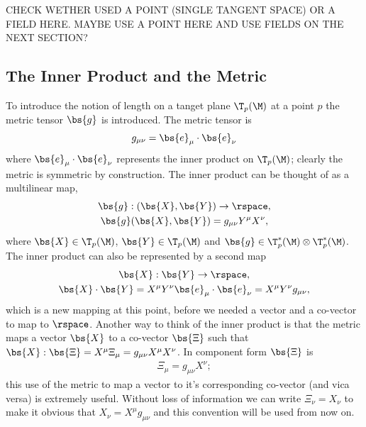 CHECK WETHER USED A POINT (SINGLE TANGENT SPACE) OR A FIELD HERE. MAYBE USE A POINT HERE AND USE FIELDS ON THE NEXT SECTION?



\subsection{The Inner Product and the Metric}
To introduce the notion of length on a tanget plane $\T_p(\M)$ at a point $p$ the metric tensor $\bs{g}$ is introduced. The metric tensor is 
\begin{equation}
g_{\mu\nu} = \bs{e}_\mu \cdot \bs{e}_\nu
\end{equation}
where $\bs{e}_\mu \cdot \bs{e}_\nu$ represents the inner product on $\T_p(\M)$; clearly the metric is symmetric by construction. The inner product can be thought of as a multilinear map,
\begin{gather}
\bs{g} : (\bs{X} , \bs{Y}) \rightarrow \rspace ,\\
\bs{g}(\bs{X},\bs{Y}) = g_{\mu\nu} Y^\mu X^\nu,
\end{gather}
where $\bs{X}\in \T_p(\M)$, $\bs{Y}\in \T_p(\M)$ and $\bs{g}\in \T^*_p(\M)\otimes  \T^*_p(\M)$. The inner product can also be represented by a second map
\begin{gather}
\bs{X} : \bs{Y} \rightarrow \rspace ,\\
\bs{X} \cdot \bs{Y} = X^\mu Y^\nu \bs{e}_\mu \cdot \bs{e}_\nu = X^\mu Y^\nu g_{\mu\nu},
\end{gather}
which is a new mapping at this point, before we needed a vector and a co-vector to map to $\rspace$. Another way to think of the inner product is that the metric maps a vector $\bs{X}$ to a co-vector $\bs{\Xi}$ such that $\bs{X} : \bs{\Xi} = X^\mu \Xi_\mu= g_{\mu\nu}X^\mu X^\nu$. In component form $\bs{\Xi}$ is
\begin{align}
\Xi_\mu = g_{\mu\nu}X^\nu;
\end{align}
this use of the metric to map a vector to it's corresponding co-vector (and vica versa) is extremely useful. Without loss of information we can write $\Xi_\nu = X_\nu$ to make it obvious that $X_\nu = X^\mu g_{\mu\nu}$ and this convention will be used from now on.

